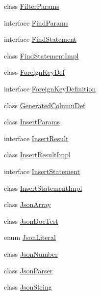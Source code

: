 \begin{DoxyCompactItemize}
\item 
class \mbox{\hyperlink{classcom_1_1mysql_1_1cj_1_1xdevapi_1_1_filter_params}{Filter\+Params}}
\item 
interface \mbox{\hyperlink{interfacecom_1_1mysql_1_1cj_1_1xdevapi_1_1_find_params}{Find\+Params}}
\item 
interface \mbox{\hyperlink{interfacecom_1_1mysql_1_1cj_1_1xdevapi_1_1_find_statement}{Find\+Statement}}
\item 
class \mbox{\hyperlink{classcom_1_1mysql_1_1cj_1_1xdevapi_1_1_find_statement_impl}{Find\+Statement\+Impl}}
\item 
class \mbox{\hyperlink{classcom_1_1mysql_1_1cj_1_1xdevapi_1_1_foreign_key_def}{Foreign\+Key\+Def}}
\item 
interface \mbox{\hyperlink{interfacecom_1_1mysql_1_1cj_1_1xdevapi_1_1_foreign_key_definition}{Foreign\+Key\+Definition}}
\item 
class \mbox{\hyperlink{classcom_1_1mysql_1_1cj_1_1xdevapi_1_1_generated_column_def}{Generated\+Column\+Def}}
\item 
class \mbox{\hyperlink{classcom_1_1mysql_1_1cj_1_1xdevapi_1_1_insert_params}{Insert\+Params}}
\item 
interface \mbox{\hyperlink{interfacecom_1_1mysql_1_1cj_1_1xdevapi_1_1_insert_result}{Insert\+Result}}
\item 
class \mbox{\hyperlink{classcom_1_1mysql_1_1cj_1_1xdevapi_1_1_insert_result_impl}{Insert\+Result\+Impl}}
\item 
interface \mbox{\hyperlink{interfacecom_1_1mysql_1_1cj_1_1xdevapi_1_1_insert_statement}{Insert\+Statement}}
\item 
class \mbox{\hyperlink{classcom_1_1mysql_1_1cj_1_1xdevapi_1_1_insert_statement_impl}{Insert\+Statement\+Impl}}
\item 
class \mbox{\hyperlink{classcom_1_1mysql_1_1cj_1_1xdevapi_1_1_json_array}{Json\+Array}}
\item 
class \mbox{\hyperlink{classcom_1_1mysql_1_1cj_1_1xdevapi_1_1_json_doc_test}{Json\+Doc\+Test}}
\item 
enum \mbox{\hyperlink{enumcom_1_1mysql_1_1cj_1_1xdevapi_1_1_json_literal}{Json\+Literal}}
\item 
class \mbox{\hyperlink{classcom_1_1mysql_1_1cj_1_1xdevapi_1_1_json_number}{Json\+Number}}
\item 
class \mbox{\hyperlink{classcom_1_1mysql_1_1cj_1_1xdevapi_1_1_json_parser}{Json\+Parser}}
\item 
class \mbox{\hyperlink{classcom_1_1mysql_1_1cj_1_1xdevapi_1_1_json_string}{Json\+String}}

\end{DoxyCompactItemize}
